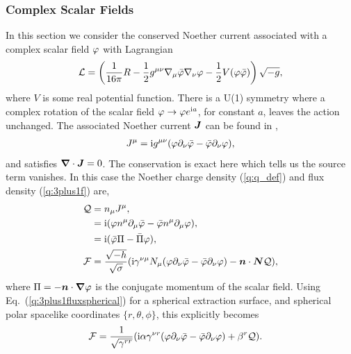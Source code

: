 \subsubsection{Complex Scalar Fields} \label{q:sect:noether1}
In this section we consider the conserved Noether current associated with a complex scalar field $\varphi$ with Lagrangian
\begin{equation}
\label{q:csfl}\mathcal{L} = \left(\frac{1}{16 \pi }R -\frac{1}{2}g^{\mu\nu}\nabla_\mu \bar{\varphi} \nabla_\nu \varphi - \frac{1}{2}V(\varphi \bar{\varphi}) \right)\sqrt{-g},
\end{equation}
where $V$ is some real potential function. There is a U(1) symmetry where a complex rotation of the scalar field $\varphi \rightarrow \varphi e^{{\rm i} a}$, for constant $a$, leaves the action unchanged. The associated Noether current $\boldsymbol{J}$ can be found in \cite{liebling2017dynamical}, 
\begin{align}
J^\mu = {\rm i} g^{\mu\nu}(\varphi\partial_\nu \bar{\varphi} - \bar{\varphi}\partial_\nu \varphi),
\end{align}
and satisfies $\boldsymbol{\nabla}\cdot\boldsymbol{J} = 0$. The conservation is exact here which tells us the source term vanishes. In this case the Noether charge density (\ref{q:q_def}) and flux density (\ref{q:3plus1f}) are,
\begin{align}
\mathcal{Q}&= n_\mu J^\mu, \\
           &= {\rm i} (\varphi n^\mu\partial_\mu \bar{\varphi} - \bar{\varphi} n^\mu\partial_\mu \varphi), \\
           & = {\rm i}(\bar{\varphi} \Pi - \bar\Pi \varphi), \\
\mathcal{F} &= \frac{\sqrt{-h}}{\sqrt{\sigma}}({\rm i}\gamma^{\nu \mu}N_\mu (\varphi \partial_\nu \bar{\varphi} - \bar{\varphi} \partial_\nu \varphi) - \boldsymbol{n} \cdot \boldsymbol{N}  \mathcal{Q}),
\end{align}
where $\Pi = -\boldsymbol{n} \cdot\boldsymbol{\nabla}\varphi$ is the conjugate momentum of the scalar field. Using Eq.~(\ref{q:3plus1fluxspherical}) for a spherical extraction surface, and spherical polar spacelike coordinates $\{r,\theta,\phi\}$, this explicitly becomes
\begin{align}
\mathcal{F} &= \frac{1}{\sqrt{\gamma^{rr}}}({\rm i}\alpha\gamma^{\nu r} (\varphi \partial_\nu \bar{\varphi} - \bar{\varphi} \partial_\nu \varphi) + {\beta^r} \mathcal{Q}).
       \end{align}




